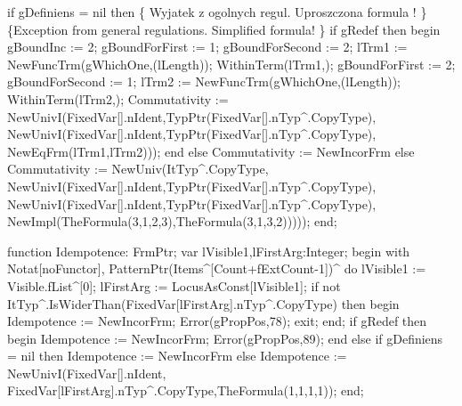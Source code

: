       if gDefiniens = nil then
         \{ Wyjatek z ogolnych regul. Uproszczona formula ! \}
         \{Exception from general regulations. Simplified formula! \}
         if gRedef then
         begin
            gBoundInc := 2;
            gBoundForFirst := 1; gBoundForSecond := 2;
            lTrm1 := NewFuncTrm(gWhichOne,(lLength));
            WithinTerm(lTrm1,);
            gBoundForFirst := 2; gBoundForSecond := 1;
            lTrm2 := NewFuncTrm(gWhichOne,(lLength));
            WithinTerm(lTrm2,);
            Commutativity := 
               NewUnivI(FixedVar[].nIdent,TypPtr(FixedVar[].nTyp^.CopyType),
                        NewUnivI(FixedVar[].nIdent,TypPtr(FixedVar[].nTyp^.CopyType),
                                 NewEqFrm(lTrm1,lTrm2)));
         end
         else Commutativity := NewIncorFrm
         else
            Commutativity := 
               NewUniv(ItTyp^.CopyType,
                       NewUnivI(FixedVar[].nIdent,TypPtr(FixedVar[].nTyp^.CopyType),
                                NewUnivI(FixedVar[].nIdent,TypPtr(FixedVar[].nTyp^.CopyType),
                                         NewImpl(TheFormula(3,1,2,3),TheFormula(3,1,3,2)))));
   end;
   
   function Idempotence: FrmPtr;
   var lVisible1,lFirstArg:Integer;
   begin
      with Notat[noFunctor], PatternPtr(Items^[Count+fExtCount-1])^ do
                                lVisible1 := Visible.fList^[0];
      lFirstArg := LocusAsConst[lVisible1];
      if not ItTyp^.IsWiderThan(FixedVar[lFirstArg].nTyp^.CopyType) then
      begin
         Idempotence := NewIncorFrm;
         Error(gPropPos,78);
         exit;
      end;
      if gRedef then
      begin
         Idempotence := NewIncorFrm;
         Error(gPropPos,89);
      end
      else
         if gDefiniens = nil then Idempotence := NewIncorFrm
         else
            Idempotence := NewUnivI(FixedVar[].nIdent,
                                    FixedVar[lFirstArg].nTyp^.CopyType,TheFormula(1,1,1,1));
   end;
   
